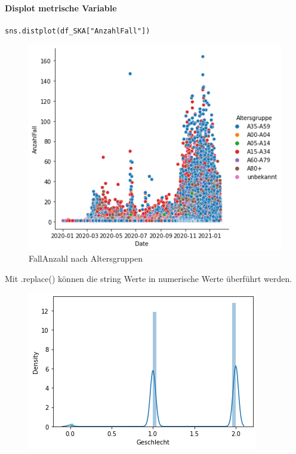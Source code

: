 \paragraph{Displot metrische Variable}
\begin{lstlisting}[style=python]
	sns.distplot(df_SKA["AnzahlFall"])
\end{lstlisting}
\begin{figure}[H]
	\centering
	\includegraphics[scale = 0.8]{attachment/chapter_3/Scc086}
	\caption{FallAnzahl nach Altersgruppen}
\end{figure} 

Mit .replace() können die string Werte in numerische Werte überführt werden.
\begin{figure}[H]
	\centering
	\includegraphics[scale = 0.8]{attachment/chapter_3/Scc089}
\end{figure} 


